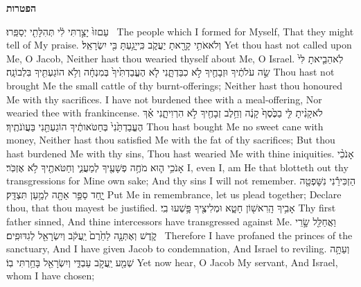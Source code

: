 \vspace{24pt}\LARGE \textbf{הפטרות} \normalsize\vspace{-16pt}
\label{haft_24}
\setcounter{chap}{43}
\setcounter{verse}{21}
{עַם\maqqaf זוּ֙ יָצַ֣רְתִּי לִ֔י תְּהִלָּתִ֖י יְסַפֵּֽרוּ׃ \setuma }
{The people which I formed for Myself, That they might tell of My praise.}
{וְלֹא\maqqaf אֹתִ֥י קָרָ֖אתָ יַעֲקֹ֑ב כִּֽי\maqqaf יָגַ֥עְתָּ בִּ֖י יִשְׂרָאֵֽל׃}
{Yet thou hast not called upon Me, O Jacob, Neither hast thou wearied thyself about Me, O Israel.}
{לֹֽא\maqqaf הֵבֵ֤יאתָ לִּי֙ שֵׂ֣ה עֹלֹתֶ֔יךָ וּזְבָחֶ֖יךָ לֹ֣א כִבַּדְתָּ֑נִי לֹ֤א הֶעֱבַדְתִּ֙יךָ֙ בְּמִנְחָ֔ה וְלֹ֥א הוֹגַעְתִּ֖יךָ בִּלְבוֹנָֽה׃}
{Thou hast not brought Me the small cattle of thy burnt-offerings; Neither hast thou honoured Me with thy sacrifices. I have not burdened thee with a meal-offering, Nor wearied thee with frankincense.}
{לֹא\maqqaf קָנִ֨יתָ לִּ֤י בַכֶּ֙סֶף֙ קָנֶ֔ה וְחֵ֥לֶב זְבָחֶ֖יךָ לֹ֣א הִרְוִיתָ֑נִי אַ֗ךְ הֶעֱבַדְתַּ֙נִי֙ בְּחַטֹּאותֶ֔יךָ הוֹגַעְתַּ֖נִי בַּעֲוֺנֹתֶֽיךָ׃}
{Thou hast bought Me no sweet cane with money, Neither hast thou satisfied Me with the fat of thy sacrifices; But thou hast burdened Me with thy sins, Thou hast wearied Me with thine iniquities.}
{אָנֹכִ֨י אָנֹכִ֥י ה֛וּא מֹחֶ֥ה פְשָׁעֶ֖יךָ לְמַעֲנִ֑י וְחַטֹּאתֶ֖יךָ לֹ֥א אֶזְכֹּֽר׃}
{I, even I, am He that blotteth out thy transgressions for Mine own sake; And thy sins I will not remember.}
{הַזְכִּירֵ֕נִי נִשָּׁפְטָ֖ה יָ֑חַד סַפֵּ֥ר אַתָּ֖ה לְמַ֥עַן תִּצְדָּֽק׃}
{Put Me in remembrance, let us plead together; Declare thou, that thou mayest be justified.}
{אָבִ֥יךָ הָֽרִאשׁ֖וֹן חָטָ֑א וּמְלִיצֶ֖יךָ פָּ֥שְׁעוּ בִֽי׃}
{Thy first father sinned, And thine intercessors have transgressed against Me.}
{וַאֲחַלֵּ֖ל שָׂ֣רֵי קֹ֑דֶשׁ וְאֶתְּנָ֤ה לַחֵ֙רֶם֙ יַֽעֲקֹ֔ב וְיִשְׂרָאֵ֖ל לְגִדּוּפִֽים׃ \petucha }
{Therefore I have profaned the princes of the sanctuary, And I have given Jacob to condemnation, And Israel to reviling.}
\newperek
{}
{וְעַתָּ֥ה שְׁמַ֖ע יַֽעֲקֹ֣ב עַבְדִּ֑י וְיִשְׂרָאֵ֖ל בָּחַ֥רְתִּי בֽוֹ׃}
{Yet now hear, O Jacob My servant, And Israel, whom I have chosen;}
